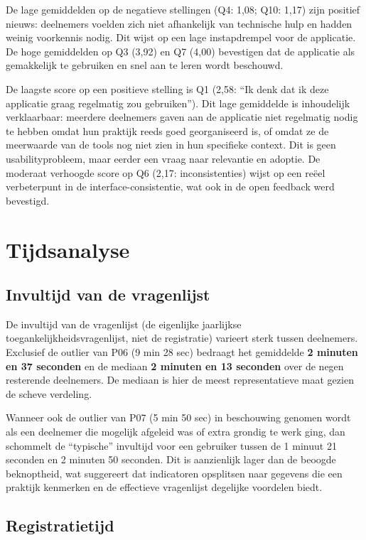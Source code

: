 De lage gemiddelden op de negatieve stellingen (Q4: 1,08; Q10: 1,17) zijn positief nieuws: deelnemers voelden zich niet afhankelijk van technische hulp en hadden weinig voorkennis nodig.
Dit wijst op een lage instapdrempel voor de applicatie.
\medskip
De hoge gemiddelden op Q3 (3,92) en Q7 (4,00) bevestigen dat de applicatie als gemakkelijk te gebruiken en snel aan te leren wordt beschouwd.
\medskip

De laagste score op een positieve stelling is Q1 (2,58: ``Ik denk dat ik deze applicatie graag regelmatig zou gebruiken'').
Dit lage gemiddelde is inhoudelijk verklaarbaar: meerdere deelnemers gaven aan de applicatie niet regelmatig nodig te hebben omdat hun praktijk reeds goed georganiseerd is, of omdat ze de meerwaarde van de tools nog niet zien in hun specifieke context.
Dit is geen usabilityprobleem, maar eerder een vraag naar relevantie en adoptie.
\medskip
De moderaat verhoogde score op Q6 (2,17: inconsistenties) wijst op een reëel verbeterpunt in de interface-consistentie, wat ook in de open feedback werd bevestigd.

\section{Tijdsanalyse}
\label{sec:tijden}
 
\subsection{Invultijd van de vragenlijst}
 
De invultijd van de vragenlijst (de eigenlijke jaarlijkse toegankelijkheidsvragenlijst, niet de registratie) varieert sterk tussen deelnemers.
Exclusief de outlier van P06 (9 min 28 sec) bedraagt het gemiddelde \textbf{2 minuten en 37 seconden} en de mediaan \textbf{2 minuten en 13 seconden} over de negen resterende deelnemers.
De mediaan is hier de meest representatieve maat gezien de scheve verdeling.
\medskip

Wanneer ook de outlier van P07 (5 min 50 sec) in beschouwing genomen wordt als een deelnemer die mogelijk afgeleid was of extra grondig te werk ging, dan schommelt de ``typische'' invultijd voor een gebruiker tussen de 1 minuut 21 seconden en 2 minuten 50 seconden.
Dit is aanzienlijk lager dan de beoogde beknoptheid, wat suggereert dat indicatoren opsplitsen naar gegevens die een praktijk kenmerken en de effectieve vragenlijst degelijke voordelen biedt.
 
\subsection{Registratietijd}
 
